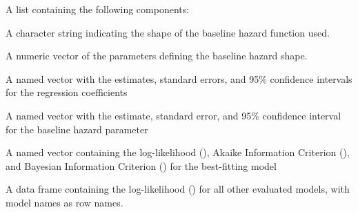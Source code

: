 \documentclass[a4paper]{book}
\begin{document}
%
\begin{Value}
A list containing the following components:
\begin{ldescription}
\item[\code{model}] A character string indicating the shape of the baseline hazard function used.
\item[\code{parameter}] A numeric vector of the parameters defining the baseline hazard shape.
\item[\code{beta}] A named vector with the estimates, standard errors, and 95\% confidence intervals for the regression coefficients
\item[\code{gamma}] A named vector with the estimate, standard error, and 95\% confidence interval for the baseline hazard parameter
\item[\code{loglik}] A named vector containing the log-likelihood (),
Akaike Information Criterion (), and Bayesian Information
Criterion () for the best-fitting model
\item[\code{other\_models}] A data frame containing the log-likelihood () for all other evaluated models,
with model names as row names.
\end{ldescription}
\end{Value}
%
\begin{Examples}
\end{Examples}
\printindex{}
\end{document}
